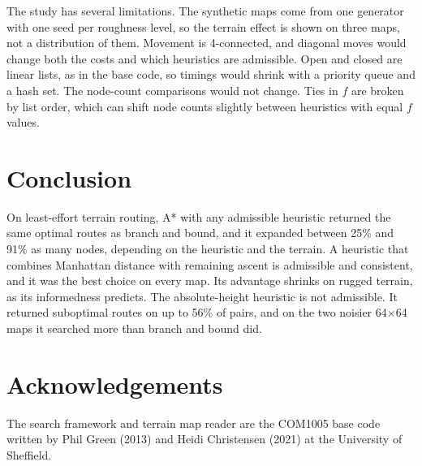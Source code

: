 \documentclass[11pt]{article}
\begin{document}
The study has several limitations. The synthetic maps come from one generator with one seed per roughness level, so the terrain effect is shown on three maps, not a distribution of them. Movement is 4-connected, and diagonal moves would change both the costs and which heuristics are admissible. Open and closed are linear lists, as in the base code, so timings would shrink with a priority queue and a hash set. The node-count comparisons would not change. Ties in $f$ are broken by list order, which can shift node counts slightly between heuristics with equal $f$ values.

\section{Conclusion}
On least-effort terrain routing, A* with any admissible heuristic returned the same optimal routes as branch and bound, and it expanded between 25\% and 91\% as many nodes, depending on the heuristic and the terrain. A heuristic that combines Manhattan distance with remaining ascent is admissible and consistent, and it was the best choice on every map. Its advantage shrinks on rugged terrain, as its informedness predicts. The absolute-height heuristic is not admissible. It returned suboptimal routes on up to 56\% of pairs, and on the two noisier 64$\times$64 maps it searched more than branch and bound did.

\section*{Acknowledgements}
The search framework and terrain map reader are the COM1005 base code written by Phil Green (2013) and Heidi Christensen (2021) at the University of Sheffield.



\end{document}
